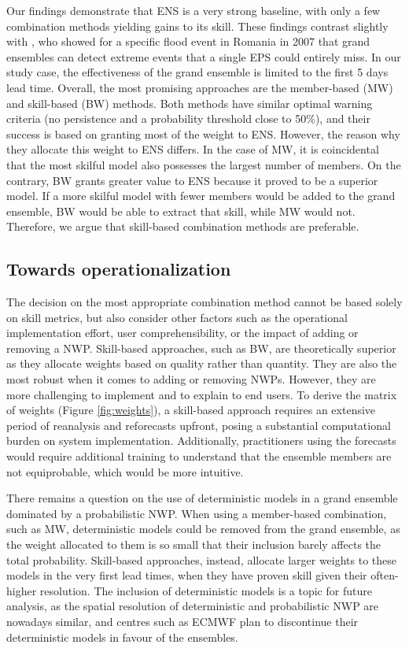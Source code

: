 \documentclass{ametsocV6.1}
\begin{document}
Our findings demonstrate that ENS is a very strong baseline, with only a few combination methods yielding gains to its skill. These findings contrast slightly with \citet{Pappenberger2008b}, who showed for a specific flood event in Romania in 2007 that grand ensembles can detect extreme events that a single EPS could entirely miss. In our study case, the effectiveness of the grand ensemble is limited to the first 5 days lead time. Overall, the most promising approaches are the member-based (MW) and skill-based (BW) methods. Both methods have similar optimal warning criteria (no persistence and a probability threshold close to 50\%), and their success is based on granting most of the weight to ENS. However, the reason why they allocate this weight to ENS differs. In the case of MW, it is coincidental that the most skilful model also possesses the largest number of members. On the contrary, BW grants greater value to ENS because it proved to be a superior model. If a more skilful model with fewer members would be added to the grand ensemble, BW would be able to extract that skill, while MW would not. Therefore, we argue that skill-based combination methods are preferable. 

\subsection{Towards operationalization}
\label{disc:operationalization}

The decision on the most appropriate combination method cannot be based solely on skill metrics, but also consider other factors such as the  operational implementation effort, user comprehensibility, or the impact of adding or removing a NWP. Skill-based approaches, such as BW, are theoretically superior as they allocate weights based on quality rather than quantity. They are also the most robust when it comes to adding or removing NWPs. However, they are more challenging to implement and to explain to end users. To derive the matrix of weights (Figure \ref{fig:weights}), a skill-based approach requires an extensive period of reanalysis and reforecasts upfront, posing a substantial computational burden on system implementation. Additionally,  practitioners using the forecasts would require additional training to understand that the ensemble members are not equiprobable, which would be more intuitive.

There remains a question on the use of deterministic models in a grand ensemble dominated by a probabilistic NWP. When using a member-based combination, such as MW, deterministic models could be removed from the grand ensemble, as the weight allocated to them is so small that their inclusion barely affects the total probability. Skill-based approaches, instead, allocate larger weights to these models in the very first lead times, when they have proven skill given their often-higher resolution. The inclusion of deterministic models is a topic for future analysis, as the spatial resolution of deterministic and probabilistic NWP are nowadays similar, and centres such as ECMWF plan to discontinue their deterministic models in favour of the ensembles.
\end{document}
